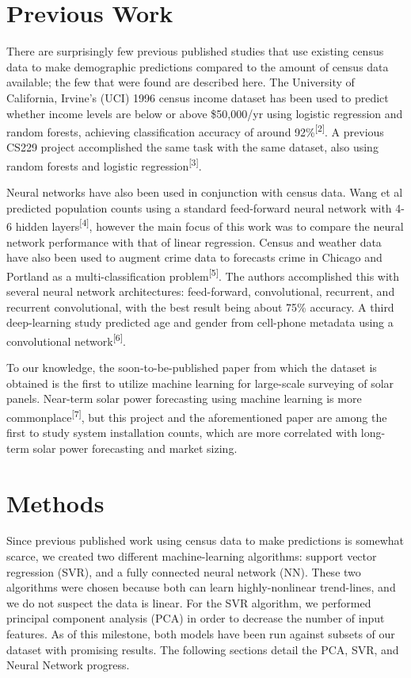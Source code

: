 \documentclass{article}
\begin{document}
	
	\section{Previous Work}
	\label{previous_work}
	
	There are surprisingly few previous published studies that use existing census data to make demographic predictions compared to the amount of census data available; the few that were found are described here. The University of California, Irvine’s (UCI) 1996 census income dataset has been used to predict whether income levels are below or above \$50,000/yr using logistic regression and random forests, achieving classification accuracy of around 92\%\textsuperscript{[2]}. A previous CS229 project accomplished the same task with the same dataset, also using random forests and logistic regression\textsuperscript{[3]}.
	
	Neural networks have also been used in conjunction with census data. Wang et al predicted population counts using a standard feed-forward neural network with 4-6 hidden layers\textsuperscript{[4]}, however the main focus of this work was to compare the neural network performance with that of linear regression. Census and weather data have also been used to augment crime data to forecasts crime in Chicago and Portland as a multi-classification problem\textsuperscript{[5]}. The authors accomplished this with several neural network architectures: feed-forward, convolutional, recurrent, and recurrent convolutional, with the best result being about 75\% accuracy. A third deep-learning study predicted age and gender from cell-phone metadata using a convolutional network\textsuperscript{[6]}. 
	
	To our knowledge, the soon-to-be-published paper from which the dataset is obtained is the first to utilize machine learning for large-scale surveying of solar panels. Near-term solar power forecasting using machine learning is more commonplace\textsuperscript{[7]}, but this project and the aforementioned paper are among the first to study system installation counts, which are more correlated with long-term solar power forecasting and market sizing.
	
	
	\section{Methods}
	
	Since previous published work using census data to make predictions is somewhat scarce, we created two different machine-learning algorithms: support vector regression (SVR), and a fully connected neural network (NN). These two algorithms were chosen because both can learn highly-nonlinear trend-lines, and we do not suspect the data is linear. For the SVR algorithm, we performed principal component analysis (PCA) in order to decrease the number of input features. As of this milestone, both models have been run against subsets of our dataset with promising results. The following sections detail the PCA, SVR, and Neural Network progress.
	
\end{document}
